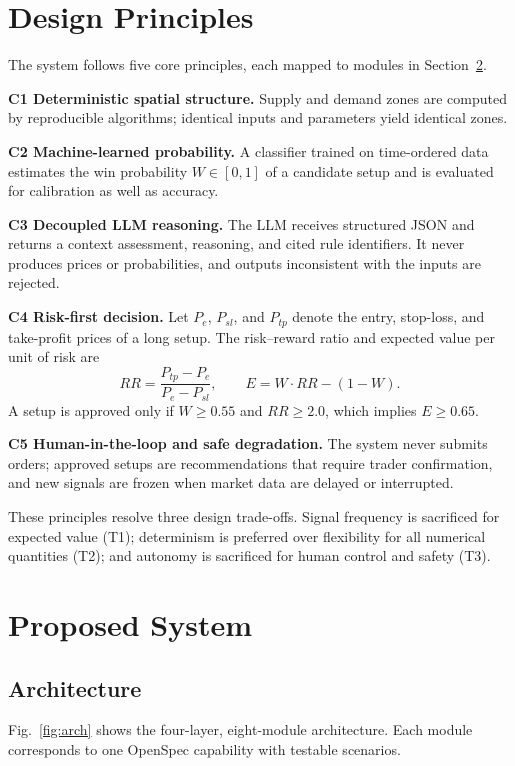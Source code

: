 \documentclass[conference]{IEEEtran}
\begin{document}
\section{Design Principles}\label{sec:principles}

The system follows five core principles, each mapped to modules in Section~\ref{sec:system}.

\textbf{C1 Deterministic spatial structure.} Supply and demand zones are computed by reproducible algorithms; identical inputs and parameters yield identical zones.

\textbf{C2 Machine-learned probability.} A classifier trained on time-ordered data estimates the win probability $W \in [0,1]$ of a candidate setup and is evaluated for calibration as well as accuracy.

\textbf{C3 Decoupled LLM reasoning.} The LLM receives structured JSON and returns a context assessment, reasoning, and cited rule identifiers. It never produces prices or probabilities, and outputs inconsistent with the inputs are rejected.

\textbf{C4 Risk-first decision.} Let $P_e$, $P_{sl}$, and $P_{tp}$ denote the entry, stop-loss, and take-profit prices of a long setup. The risk--reward ratio and expected value per unit of risk are
\begin{equation}
RR = \frac{P_{tp}-P_e}{P_e-P_{sl}}, \qquad E = W \cdot RR - (1-W).
\label{eq:ev}
\end{equation}
A setup is approved only if $W \ge 0.55$ and $RR \ge 2.0$, which implies $E \ge 0.65$.

\textbf{C5 Human-in-the-loop and safe degradation.} The system never submits orders; approved setups are recommendations that require trader confirmation, and new signals are frozen when market data are delayed or interrupted.

These principles resolve three design trade-offs. Signal frequency is sacrificed for expected value (T1); determinism is preferred over flexibility for all numerical quantities (T2); and autonomy is sacrificed for human control and safety (T3).

\section{Proposed System}\label{sec:system}

\subsection{Architecture}
Fig.~\ref{fig:arch} shows the four-layer, eight-module architecture. Each module corresponds to one OpenSpec capability with testable scenarios.
\end{document}
